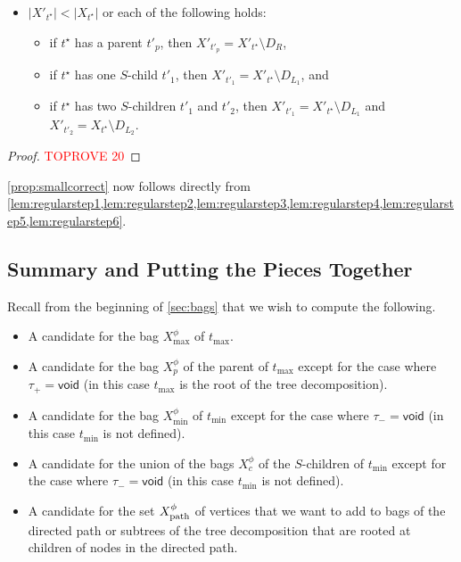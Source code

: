 \documentclass[a4paper,UKenglish,cleveref, autoref, thm-restate, numberwithinsect]{lipics-v2021}
\newcommand{\void}{\mathsf{void}}
\newcommand{\dpath}{\textup{path}}
\begin{document}
\begin{lemma}
\begin{itemize}
\item $|X'_{t^{\star}}|<|X_{t^{\star}}|$ or each of the following holds:
\begin{itemize}
    \item if $t^{\star}$ has a parent $t'_p$, then $X'_{t'_p}=X'_{t^{\star}}\setminus D_R$, 
    \item if $t^{\star}$ has one $S$-child $t'_1$, then $X'_{t'_1}=X'_{t^{\star}}\setminus D_{L_1}$, and 
    \item if $t^{\star}$ has two $S$-children $t'_1$ and $t'_2$, then $X'_{t'_1}=X'_{t^{\star}}\setminus D_{L_1}$ and $X'_{t'_2}=X_{t^{\star}}\setminus D_{L_2}$.
\end{itemize}
\end{itemize}
\end{lemma}
\begin{proof}\textcolor{red}{TOPROVE 20}\end{proof}







\cref{prop:smallcorrect} now follows directly from \cref{lem:regularstep1,lem:regularstep2,lem:regularstep3,lem:regularstep4,lem:regularstep5,lem:regularstep6}.

\subsection{Summary and Putting the Pieces Together}\label{sec:pieces}

Recall from the beginning of \cref{sec:bags} that we wish to compute the following.
\begin{itemize}
    \item A candidate for the bag $X^\phi_{\max}$ of $t_{\max}$.
    \item A candidate for the bag $X_p^\phi$ of the parent of $t_{\max}$ except for the case where $\tau_+=\void$ (in this case $t_{\max}$ is the root of the tree decomposition).
    \item A candidate for the bag $X^\phi_{\min}$ of $t_{\min}$ except for the case where $\tau_-=\void$ (in this case $t_{\min}$ is not defined).
    \item A candidate for the union of the bags $X_c^\phi$ of the $S$-children of $t_{\min}$ except for the case where $\tau_-=\void$ (in this case $t_{\min}$ is not defined).
    \item A candidate for the set $X^\phi_{\dpath}$ of vertices that we want to add to bags of the directed path or subtrees of the tree decomposition that are rooted at children of nodes in the directed path.
\end{itemize}
\end{document}

